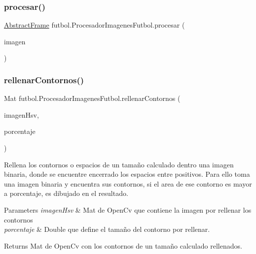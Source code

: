 \subsubsection{\texorpdfstring{procesar()}{procesar()}}
{\footnotesize\ttfamily \hyperlink{classfutbol_1_1_abstract_frame}{Abstract\+Frame} futbol.\+Procesador\+Imagenes\+Futbol.\+procesar (\begin{DoxyParamCaption}\item[{\hyperlink{classfutbol_1_1_abstract_frame}{Abstract\+Frame}}]{imagen }\end{DoxyParamCaption})}

\hypertarget{classfutbol_1_1_procesador_imagenes_futbol_af9dbd06665acbcac8e03418a0b1207c4}{}\label{classfutbol_1_1_procesador_imagenes_futbol_af9dbd06665acbcac8e03418a0b1207c4} 
\subsubsection{\texorpdfstring{rellenar\+Contornos()}{rellenarContornos()}}
{\footnotesize\ttfamily Mat futbol.\+Procesador\+Imagenes\+Futbol.\+rellenar\+Contornos (\begin{DoxyParamCaption}\item[{Mat}]{imagen\+Hsv,  }\item[{double}]{porcentaje }\end{DoxyParamCaption})\hspace{0.3cm}{\ttfamily [private]}}

Rellena los contornos o espacios de un tamaño calculado dentro una imagen binaria, donde se encuentre encerrado los espacios entre positivos. Para ello toma una imagen binaria y encuentra sus contornos, si el area de ese contorno es mayor a porcentaje, es dibujado en el resultado. 
\begin{DoxyParams}{Parameters}
{\em imagen\+Hsv} & Mat de Open\+Cv que contiene la imagen por rellenar los contornos \\
\hline
{\em porcentaje} & Double que define el tamaño del contorno por rellenar. \\
\hline
\end{DoxyParams}
\begin{DoxyReturn}{Returns}
Mat de Open\+Cv con los contornos de un tamaño calculado rellenados. 
\end{DoxyReturn}
\hypertarget{classfutbol_1_1_procesador_imagenes_futbol_abeec15363609c5b4d3a74da6fdf65da4}{}\label{classfutbol_1_1_procesador_imagenes_futbol_abeec15363609c5b4d3a74da6fdf65da4} 
